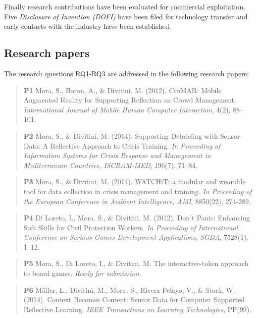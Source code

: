 Finally research contributions have been evaluated for commercial
exploitation. Five \emph{Disclosure of Invention (DOFI)} have been filed
for technology transfer and early contacts with the industry have been
established.

\subsection{Research papers}\label{research-papers}

The research questions RQ1-RQ3 are addressed in the following research
papers:

\begin{quote}
\textbf{P1} Mora, S., Boron, A., \& Divitini, M. (2012). CroMAR: Mobile
Augmented Reality for Supporting Reflection on Crowd Management.
\emph{International Journal of Mobile Human Computer Interaction}, 4(2),
88--101.
\end{quote}

\begin{quote}
\textbf{P2} Mora, S., \& Divitini, M. (2014). Supporting Debriefing with
Sensor Data: A Reflective Approach to Crisis Training. \emph{In
Proceeding of Information Systems for Crisis Response and Management in
Mediterranean Countries, ISCRAM-MED}, 196(7), 71--84.
\end{quote}

\begin{quote}
\textbf{P3} Mora, S., \& Divitini, M. (2014). WATCHiT: a modular and
wearable tool for data collection in crisis management and training.
\emph{In Proceeding of the European Conference in Ambient Intelligence,
AMI}, 8850(22), 274-289.
\end{quote}

\begin{quote}
\textbf{P4} Di Loreto, I., Mora, S., \& Divitini, M. (2012). Don't
Panic: Enhancing Soft Skills for Civil Protection Workers. \emph{In
Proceeding of International Conference on Serious Games Development
Applications, SGDA}, 7528(1), 1--12.
\end{quote}

\begin{quote}
\textbf{P5} Mora, S., Di Loreto, I., \& Divitini, M. The
interactive-token approach to board games. \emph{Ready for submission}.
\end{quote}

\begin{quote}
\textbf{P6} Müller, L., Divitini, M., Mora, S., Rivera-Pelayo, V., \&
Stork, W. (2014). Context Becomes Content: Sensor Data for Computer
Supported Reflective Learning. \emph{IEEE Transactions on Learning
Technologies}, PP(99).
\end{quote}

